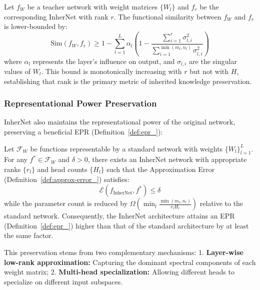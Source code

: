 \documentclass{article} %
\begin{document}
\begin{proposition}\label{prop:knowledge-preservation_}
Let $f_W$ be a teacher network with weight matrices $\{W_l\}$ and $f_r$ be the corresponding InherNet with rank $r$. The functional similarity between $f_W$ and $f_r$ is lower-bounded by:
\begin{equation}
\text{Sim}(f_W, f_r) \geq 1 - \sum_{l=1}^L \alpha_l \left(1 - \frac{\sum_{i=1}^{r} \sigma_{l,i}^2}{\sum_{i=1}^{\min(m_l,n_l)} \sigma_{l,i}^2}\right)
\end{equation}
where $\alpha_l$ represents the layer's influence on output, and $\sigma_{l,i}$ are the singular values of $W_l$. This bound is monotonically increasing with $r$ but not with $H$, establishing that rank is the primary metric of inherited knowledge preservation.
\end{proposition}

\subsubsection{Representational Power Preservation}

InherNet also maintains the representational power of the original network, preserving a beneficial EPR (Definition~\ref{def:epr_}):

\begin{theorem}\label{thm:rep-power_}
Let $\mathcal{F}_W$ be functions representable by a standard network with weights $\{W_l\}_{l=1}^L$. For any $f^* \in \mathcal{F}_W$ and $\delta > 0$, there exists an InherNet network with appropriate ranks $\{r_l\}$ and head counts $\{H_l\}$ such that the Approximation Error (Definition~\ref{def:approx-error_}) satisfies:
\begin{equation}
\mathcal{E}(f_{\text{InherNet}}, f^*) \le \delta
\end{equation}
while the parameter count is reduced by $\Omega(\min_{l} \frac{\min(m_l,n_l)}{r_l H_l})$ relative to the standard network. Consequently, the InherNet architecture attains an EPR (Definition~\ref{def:epr_}) higher than that of the standard architecture by at least the same factor.
\end{theorem}

This preservation stems from two complementary mechanisms:
1. \textbf{Layer-wise low-rank approximation:} Capturing the dominant spectral components of each weight matrix;
2. \textbf{Multi-head specialization:} Allowing different heads to specialize on different input subspaces.
\end{document}
